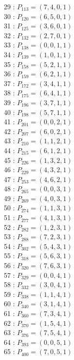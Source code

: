 \documentclass{article}
\begin{document}
{\begin{multicols}{3}
29 : $P_{113}=( 7, 4, 0, 1 )$\\
30 : $P_{120}=( 6, 5, 0, 1 )$\\
31 : $P_{125}=( 3, 6, 0, 1 )$\\
32 : $P_{132}=( 2, 7, 0, 1 )$\\
33 : $P_{138}=( 0, 0, 1, 1 )$\\
34 : $P_{139}=( 1, 0, 1, 1 )$\\
35 : $P_{158}=( 5, 2, 1, 1 )$\\
36 : $P_{159}=( 6, 2, 1, 1 )$\\
37 : $P_{172}=( 3, 4, 1, 1 )$\\
38 : $P_{175}=( 6, 4, 1, 1 )$\\
39 : $P_{196}=( 3, 7, 1, 1 )$\\
40 : $P_{198}=( 5, 7, 1, 1 )$\\
41 : $P_{201}=( 0, 0, 2, 1 )$\\
42 : $P_{207}=( 6, 0, 2, 1 )$\\
43 : $P_{210}=( 1, 1, 2, 1 )$\\
44 : $P_{215}=( 6, 1, 2, 1 )$\\
45 : $P_{226}=( 1, 3, 2, 1 )$\\
46 : $P_{229}=( 4, 3, 2, 1 )$\\
47 : $P_{253}=( 4, 6, 2, 1 )$\\
48 : $P_{265}=( 0, 0, 3, 1 )$\\
49 : $P_{269}=( 4, 0, 3, 1 )$\\
50 : $P_{274}=( 1, 1, 3, 1 )$\\
51 : $P_{277}=( 4, 1, 3, 1 )$\\
52 : $P_{282}=( 1, 2, 3, 1 )$\\
53 : $P_{288}=( 7, 2, 3, 1 )$\\
54 : $P_{302}=( 5, 4, 3, 1 )$\\
55 : $P_{318}=( 5, 6, 3, 1 )$\\
56 : $P_{320}=( 7, 6, 3, 1 )$\\
57 : $P_{329}=( 0, 0, 4, 1 )$\\
58 : $P_{332}=( 3, 0, 4, 1 )$\\
59 : $P_{338}=( 1, 1, 4, 1 )$\\
60 : $P_{340}=( 3, 1, 4, 1 )$\\
61 : $P_{360}=( 7, 3, 4, 1 )$\\
62 : $P_{370}=( 1, 5, 4, 1 )$\\
63 : $P_{376}=( 7, 5, 4, 1 )$\\
64 : $P_{393}=( 0, 0, 5, 1 )$\\
65 : $P_{400}=( 7, 0, 5, 1 )$\\

\end{multicols}}
\end{document}
